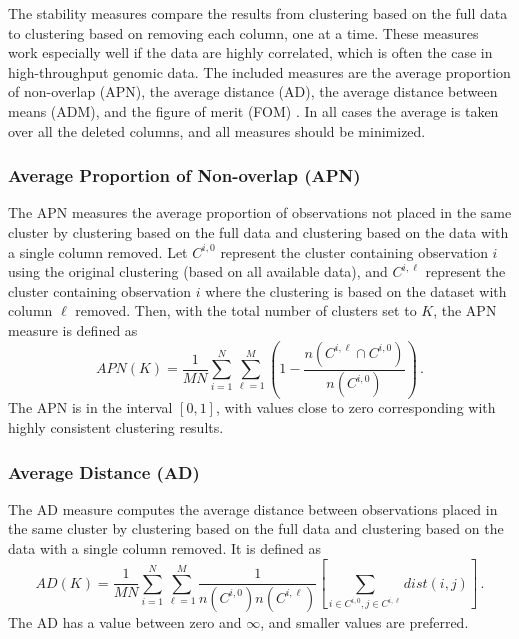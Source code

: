 \documentclass[11pt]{article}
\begin{document}
The stability measures compare the results from clustering based on
the full data to clustering based on removing each column, one at a time.
These measures work especially well if the data are highly
correlated, which is often the case in high-throughput genomic data. 
The included measures are the average proportion of non-overlap (APN),
the average distance (AD), the average distance between means (ADM),
and the figure of merit (FOM) \citep{Dat2003, Yeu2001}.    
In all cases the average is taken over all the
deleted columns, and all measures should be minimized.  

\subsubsection*{Average Proportion of Non-overlap (APN)}

The APN measures the average proportion of observations not placed in the
same cluster by clustering based on the full data and clustering based
on the data with a single column removed.  
Let $C^{i,0}$ represent the cluster
containing observation $i$ using the original clustering (based on all available
data), and $C^{i,\ell}$ represent the cluster containing observation
$i$ where the clustering is based on the dataset with column $\ell$
removed.  %
Then, with the total number of clusters set to $K$, the
APN measure is defined as 
$$
APN(K) = \frac{1}{MN}\sum\limits_{i=1}^N\sum\limits_{\ell=1}^M \left( 1 -
  \frac{n(C^{i,\ell} \cap C^{i,0})}{n(C^{i,0})} \right) \,.
$$
The APN is in the interval $[0,1]$, with values close to zero
corresponding with highly consistent clustering results.

\subsubsection*{Average Distance (AD)}

The AD measure computes the average distance between observations placed
in the same cluster by clustering based on the full data and clustering based
on the data with a single column removed.  
It is defined as 
$$
AD(K) = \frac{1}{MN}\sum\limits_{i=1}^N\sum\limits_{\ell=1}^M
\frac{1}{n(C^{i,0})n(C^{i,\ell})}\left[ \sum\limits_{i\in C^{i,0}, j
  \in C^{i,\ell}} dist(i,j)\right] \,.
$$
The AD has a value between zero and $\infty$, and smaller values are preferred.
\end{document}
